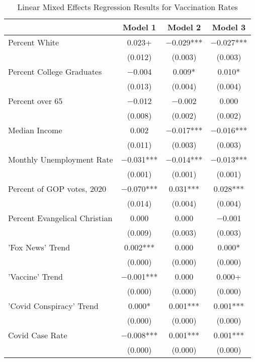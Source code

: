\begin{table}[!h]

\caption{\label{tab:vacc-tab}Linear Mixed Effects Regression Results for Vaccination Rates}
\centering
\fontsize{8}{10}\selectfont
\begin{tabular}[t]{lccc}
\toprule
  & Model 1 & Model 2 & Model 3\\
\midrule
Percent White & \num{0.023}+ & \num{-0.029}*** & \num{-0.027}***\\
 & (\num{0.012}) & (\num{0.003}) & (\num{0.003})\\
Percent College Graduates & \num{-0.004} & \num{0.009}* & \num{0.010}*\\
 & (\num{0.013}) & (\num{0.004}) & (\num{0.004})\\
Percent over 65 & \num{-0.012} & \num{-0.002} & \num{0.000}\\
 & (\num{0.008}) & (\num{0.002}) & (\num{0.002})\\
Median Income & \num{0.002} & \num{-0.017}*** & \num{-0.016}***\\
 & (\num{0.011}) & (\num{0.003}) & (\num{0.003})\\
Monthly Unemployment Rate & \num{-0.031}*** & \num{-0.014}*** & \num{-0.013}***\\
 & (\num{0.001}) & (\num{0.001}) & (\num{0.001})\\
Percent of GOP votes, 2020 & \num{-0.070}*** & \num{0.031}*** & \num{0.028}***\\
 & (\num{0.014}) & (\num{0.004}) & (\num{0.004})\\
Percent Evangelical Christian & \num{0.000} & \num{0.000} & \num{-0.001}\\
 & (\num{0.009}) & (\num{0.003}) & (\num{0.003})\\
'Fox News' Trend & \num{0.002}*** & \num{0.000} & \num{0.000}*\\
 & (\num{0.000}) & (\num{0.000}) & \vphantom{4} (\num{0.000})\\
'Vaccine' Trend & \num{-0.001}*** & \num{0.000} & \num{0.000}+\\
 & (\num{0.000}) & (\num{0.000}) & \vphantom{3} (\num{0.000})\\
'Covid Conspiracy' Trend & \num{0.000}* & \num{0.001}*** & \num{0.001}***\\
 & (\num{0.000}) & (\num{0.000}) & \vphantom{2} (\num{0.000})\\
Covid Case Rate & \num{-0.008}*** & \num{0.001}*** & \num{0.001}***\\
 & (\num{0.000}) & (\num{0.000}) & \vphantom{1} (\num{0.000})\\

\end{tabular}
\end{table}
